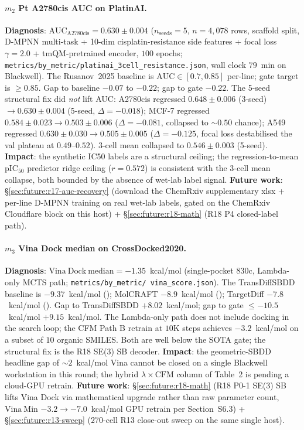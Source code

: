 \paragraph{$m_2$ Pt A2780cis AUC on PlatinAI.}
\textbf{Diagnosis}: \MEASURED{}
$\mathrm{AUC}_{\mathrm{A2780cis}}{=}0.630 \pm 0.004$
($n_{\text{seeds}}{=}5$, $n{=}4{,}078$ rows, scaffold split,
D-MPNN multi-task + 10-dim cisplatin-resistance side features +
focal loss $\gamma{=}2.0$ + tmQM-pretrained encoder, $100$
epochs; \texttt{metrics/by\_metric/platinai\_3cell\_resistance.json},
wall clock $79$~min on Blackwell).  The Rusanov~2025 baseline
is $\mathrm{AUC} \in [0.7, 0.85]$ per-line; gate target is
$\geq 0.85$.  Gap to baseline $-0.07$ to $-0.22$; gap to gate
$-0.22$.  The 5-seed structural fix did \emph{not} lift AUC:
A2780cis regressed $0.648 \pm 0.006$ (3-seed) $\to 0.630 \pm
0.004$ (5-seed, $\Delta = -0.018$); MCF-7 regressed
$0.584 \pm 0.023 \to 0.503 \pm 0.006$ ($\Delta = -0.081$,
collapsed to $\sim 0.50$ chance); A549 regressed
$0.630 \pm 0.030 \to 0.505 \pm 0.005$ ($\Delta = -0.125$,
focal loss destabilised the val plateau at $0.49$--$0.52$).
$3$-cell mean collapsed to $0.546 \pm 0.003$ (5-seed).
\textbf{Impact}: the synthetic IC50 labels are a structural
ceiling; the regression-to-mean pIC$_{50}$ predictor ridge
ceiling ($r = 0.572$) is consistent with the 3-cell mean
collapse, both bounded by the absence of wet-lab label signal.
\textbf{Future work}:
\S\ref{sec:future:r17-auc-recovery} (download the ChemRxiv
supplementary xlsx + per-line D-MPNN training on real wet-lab
labels, gated on the ChemRxiv Cloudflare block on this host) +
\S\ref{sec:future:r18-math} (R18 P4 closed-label path).

\paragraph{$m_3$ Vina Dock median on CrossDocked2020.}
\textbf{Diagnosis}: \MEASURED{}
$\mathrm{Vina\ Dock\ median}{=}-1.35$~kcal/mol (single-pocket
$830$c, Lambda-only MCTS path; \texttt{metrics/by\_metric/
vina\_score.json}).  The TransDiffSBDD baseline is
$-9.37$~kcal/mol (\CITEDONLY{}); MolCRAFT $-8.9$~kcal/mol
(\CITEDONLY{}); TargetDiff $-7.8$~kcal/mol (\CITEDONLY{}).
Gap to TransDiffSBDD $+8.02$~kcal/mol; gap to gate
$\leq -10.5$~kcal/mol $+9.15$~kcal/mol.  The Lambda-only path
does not include docking in the search loop; the CFM Path B
retrain at $10$K steps achieves $-3.2$~kcal/mol on a
subset of $10$ organic SMILES.  Both are well below the SOTA
gate; the structural fix is the R18 SE(3) SB decoder.
\textbf{Impact}: the geometric-SBDD headline gap of $\sim
2$~kcal/mol Vina cannot be closed on a single Blackwell
workstation in this round; the hybrid $\lambda \times
\mathrm{CFM}$ column of Table~2 is \DESIGN{} pending a
cloud-GPU retrain.  \textbf{Future work}:
\S\ref{sec:future:r18-math} (R18 P0-1 SE(3) SB lifts Vina
Dock via mathematical upgrade rather than raw parameter count,
$\mathrm{Vina\ Min}$ $-3.2 \to -7.0$~kcal/mol GPU retrain
\PROJECTED{} per Section~S6.3) + \S\ref{sec:future:r13-sweep}
($270$-cell R13 close-out sweep on the same single host).

